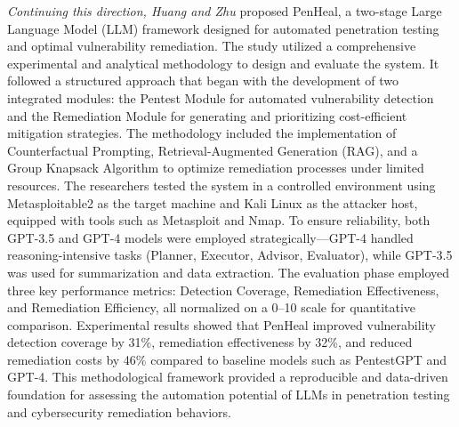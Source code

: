 \textit{Continuing this direction, Huang and Zhu} proposed PenHeal, a two-stage Large Language Model (LLM) framework designed for automated penetration testing and optimal vulnerability remediation. The study utilized a comprehensive experimental and analytical methodology to design and evaluate the system. It followed a structured approach that began with the development of two integrated modules: the Pentest Module for automated vulnerability detection and the Remediation Module for generating and prioritizing cost-efficient mitigation strategies. The methodology included the implementation of Counterfactual Prompting, Retrieval-Augmented Generation (RAG), and a Group Knapsack Algorithm to optimize remediation processes under limited resources. The researchers tested the system in a controlled environment using Metasploitable2 as the target machine and Kali Linux as the attacker host, equipped with tools such as Metasploit and Nmap. To ensure reliability, both GPT-3.5 and GPT-4 models were employed strategically—GPT-4 handled reasoning-intensive tasks (Planner, Executor, Advisor, Evaluator), while GPT-3.5 was used for summarization and data extraction. The evaluation phase employed three key performance metrics: Detection Coverage, Remediation Effectiveness, and Remediation Efficiency, all normalized on a 0–10 scale for quantitative comparison. Experimental results showed that PenHeal improved vulnerability detection coverage by 31\%, remediation effectiveness by 32\%, and reduced remediation costs by 46\% compared to baseline models such as PentestGPT and GPT-4. This methodological framework provided a reproducible and data-driven foundation for assessing the automation potential of LLMs in penetration testing and cybersecurity remediation behaviors. \cite{huang2024}

